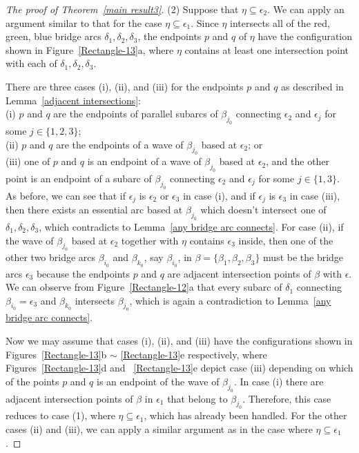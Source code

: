 \documentclass[12pt]{amsart}
\newcommand{\be}{\beta}
\newcommand{\ep}{\epsilon}
\newcommand{\del}{\delta}
\begin{document}
\begin{proof}[The proof of Theorem~\emph{\ref{main result3}}]
(2) Suppose that $\eta\subseteq \ep_2$. We can apply an argument similar to that for the case $\eta\subseteq \ep_1$.
Since $\eta$ intersects all of the red, green, blue bridge arcs $\del_1, \del_2, \del_3$,
the endpoints $p$ and $q$ of $\eta$ have the configuration shown in Figure~\ref{Rectangle-13}a, where
$\eta$ contains at least one intersection point with each of $\del_1, \del_2, \del_3$.

There are three cases (i), (ii), and (iii) for the endpoints $p$ and $q$ as described in Lemma~\ref{adjacent intersections}:\\

\noindent(i) $p$ and $q$ are the endpoints of parallel subarcs of $\be_{j_0}$ connecting $\ep_2$ and $\ep_j$ for some $j\in\{1, 2, 3\}$;\\
(ii) $p$ and $q$ are the endpoints of a wave of $\be_{j_0}$ based at $\ep_{2}$; or\\
(iii) one of $p$ and $q$ is an endpoint of a wave of $\be_{j_0}$ based at $\ep_{2}$, and the other point is an endpoint of a subarc of $\be_{j_0}$ connecting $\ep_{2}$ and $\ep_j$ for some $j\in\{1, 3\}$. \\


As before, we can see that if $\ep_j$ is $\ep_2$ or $\ep_3$ in case (i), and if $\ep_j$ is $\ep_3$ in case (iii), then there exists an essential arc based at $\be_{j_0}$ which doesn't intersect one of $\del_1, \del_2, \del_3$, which contradicts to Lemma~\ref{any bridge arc connects}. For case (ii), if the wave of $\be_{j_0}$ based at $\ep_{2}$ together with $\eta$ contains $\ep_3$ inside, then one of the other two bridge arcs $\be_{i_0}$ and $\be_{k_0}$, say $\be_{i_0}$, in $\be=\{\be_1, \be_2, \be_3\}$ must be the bridge arcs $\ep_3$ because the endpoints $p$ and $q$ are adjacent intersection points of $\be$ with $\ep$. We can observe from Figure~\ref{Rectangle-12}a that
every subarc of $\del_1$ connecting $\be_{i_0}=\ep_3$ and $\be_{k_0}$ intersects $\be_{j_0}$, which is again a contradiction to Lemma~\ref{any bridge arc connects}.


Now we may assume that cases (i), (ii), and (iii) have the configurations shown in Figures~\ref{Rectangle-13}b $\sim$ \ref{Rectangle-13}e respectively, where Figures~\ref{Rectangle-13}d and ~\ref{Rectangle-13}e depict case (iii) depending on which of the points $p$ and $q$ is an endpoint of the wave of $\be_{j_0}$. In case (i) there are adjacent intersection points of $\be$ in $\ep_1$ that belong to $\be_{j_0}$. Therefore, this case reduces to case (1), where $\eta\subseteq \ep_1$, which has already been handled. For the other cases (ii) and (iii), we can apply a similar argument as in the case where $\eta \subseteq \epsilon_1$.



\end{proof}
\end{document}
